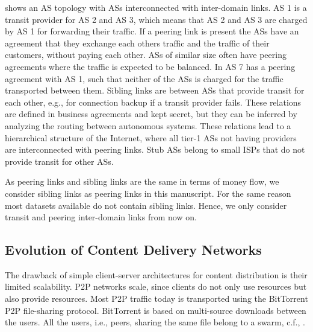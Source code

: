  shows an AS topology with ASs interconnected with inter-domain links.
AS 1 is a transit provider for AS 2 and AS 3, which means that AS 2 and AS 3 are charged by AS 1 for forwarding their traffic.
If a peering link is present the ASs have an agreement that they exchange each others traffic and the traffic of their customers, without paying each other.
ASs of similar size often have peering agreements where the traffic is expected to be balanced.
In  AS 7 has a peering agreement with AS 1, such that neither of the ASs is charged for the traffic transported between them.
Sibling links are between ASs that provide transit for each other, e.g., for connection backup if a transit provider fails. These relations are defined in business agreements and kept secret, but they can be inferred by analyzing the routing between autonomous systems.
These relations lead to a hierarchical structure of the Internet, where all tier-1 ASs not having providers are interconnected with peering links.
Stub ASs belong to small ISPs that do not provide transit for other ASs.

As peering links and sibling links are the same in terms of money flow, we consider sibling links as peering links in this manuscript. For the same reason most datasets available do not contain sibling links.
Hence, we only consider transit and peering inter-domain links from now on.


\subsection{Evolution of Content Delivery Networks}

The drawback of simple client-server architectures for content distribution is their limited scalability.
P2P networks scale, since clients do not only use resources but also provide resources.
Most P2P traffic today is transported using the BitTorrent P2P file-sharing protocol.
BitTorrent is based on multi-source downloads between the users. All the users, i.e., peers, sharing the same file belong to a swarm, c.f., .

